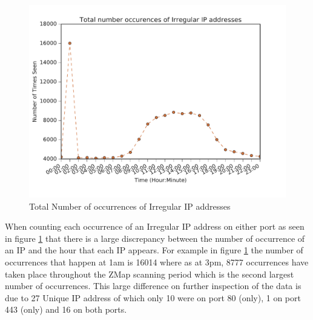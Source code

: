 \documentclass[a4wide,leqno,12pt]{report}
\begin{document}
\begin{figure}[H]
\centering
\includegraphics[scale=.5]{pdf_images/TotalNumberOccurencesOfIrregularIPaddressesOnAverage}
\caption{Total Number of occurrences of Irregular IP addresses }
\label{fig:irreg_occurence}
\end{figure}
When counting each occurrence of an Irregular IP address on either port as seen in figure \ref{fig:irreg_occurence} that there is a large discrepancy between the number of occurrence of an IP and the hour that each IP appears. For example in figure \ref{fig:irreg_occurence} the number of occurrences that happen at 1am is 16014 where as at 3pm, 8777 occurrences have taken place throughout the ZMap scanning period which is the second largest number of occurrences. This large difference on further inspection of the data is due to 27 Unique IP address of which only 10 were on port 80 (only), 1 on port 443 (only) and 16 on both ports.



\begin{table}[H]
\centering
{}
\caption{Top 10 Irregular IP addresses seen at 1am}
\label{table:2}
\end{table}
\end{document}
